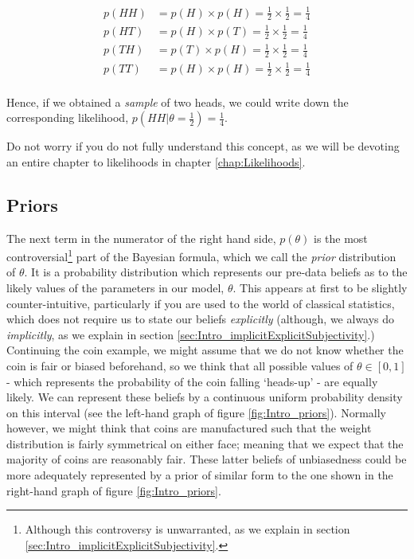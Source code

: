 \documentclass[11pt,fullpage]{book}
\begin{document}
\begin{equation}
\begin{align}
p(HH) &= p(H)\times p(H) = \frac{1}{2} \times \frac{1}{2} = \frac{1}{4}\\
p(HT) &= p(H)\times p(T) = \frac{1}{2} \times \frac{1}{2} = \frac{1}{4}\\
p(TH) &= p(T)\times p(H) = \frac{1}{2} \times \frac{1}{2} = \frac{1}{4}\\
p(TT) &= p(H)\times p(H) = \frac{1}{2} \times \frac{1}{2} = \frac{1}{4}\\
\end{align}
\end{equation}

Hence, if we obtained a \textit{sample} of two heads, we could write down the corresponding likelihood, $p(HH|\theta=\frac{1}{2})=\frac{1}{4}$.

Do not worry if you do not fully understand this concept, as we will be devoting an entire chapter to likelihoods in chapter \ref{chap:Likelihoods}.

\subsection{Priors}\label{sec:Intro_priors}
The next term in the numerator of the right hand side, $p(\theta)$ is the most controversial\footnote{Although this controversy is unwarranted, as we explain in section \ref{sec:Intro_implicitExplicitSubjectivity}.} part of the Bayesian formula, which we call the \textit{prior} distribution of $\theta$. It is a probability distribution which represents our pre-data beliefs as to the likely values of the parameters in our model, $\theta$. This appears at first to be slightly counter-intuitive, particularly if you are used to the world of classical statistics, which does not require us to state our beliefs \textit{explicitly} (although, we always do \textit{implicitly}, as we explain in section \ref{sec:Intro_implicitExplicitSubjectivity}.) Continuing the coin example, we might assume that we do not know whether the coin is fair or biased beforehand, so we think that all possible values of $\theta\in[0,1]$ - which represents the probability of the coin falling `heads-up' - are equally likely. We can represent these beliefs by a continuous uniform probability density on this interval (see the left-hand graph of figure \ref{fig:Intro_priors}). Normally however, we might think that coins are manufactured such that the weight distribution is fairly symmetrical on either face; meaning that we expect that the majority of coins are reasonably fair. These latter beliefs of unbiasedness could be more adequately represented by a prior of similar form to the one shown in the right-hand graph of figure \ref{fig:Intro_priors}.
\end{document}
